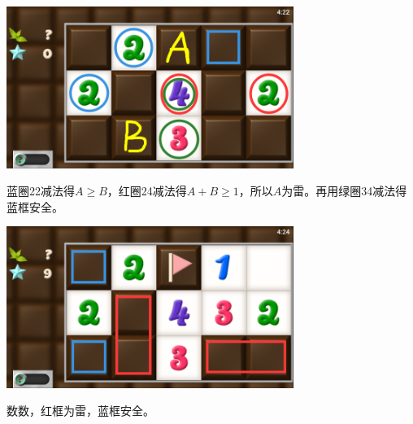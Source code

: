 \subsection{} %
\begin{center}
    \includegraphics[width=0.7\textwidth]{puzzle/95-1.png}
\end{center}
蓝圈22减法得$A\ge B$，红圈24减法得$A+B\ge 1$，所以$A$为雷。再用绿圈34减法得蓝框安全。
\begin{center}
    \includegraphics[width=0.7\textwidth]{puzzle/95-2.png}
\end{center}
数数，红框为雷，蓝框安全。

